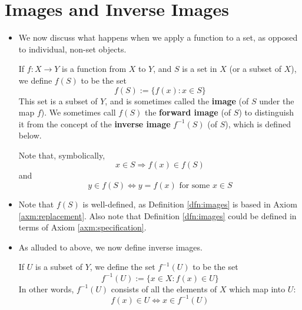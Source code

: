 \documentclass[../main.tex]{subfiles}
\begin{document}
\section{Images and Inverse Images}
\begin{itemize}
    \item {}We now discuss what happens when we apply a function to a set, as opposed to individual, non-set objects.
    \begin{dfn}\label{dfn:images}
        If $f:X\to Y$ is a function from $X$ to $Y$, and $S$ is a set in $X$ (or a subset of $X$), we define $f(S)$ to be the set
        \begin{equation*}
            f(S) := \{f(x):x\in S\}
        \end{equation*}
        This set is a subset of $Y$, and is sometimes called the \textbf{image} (of $S$ under the map $f$). We sometimes call $f(S)$ the \textbf{forward image} (of $S$) to distinguish it from the concept of the \textbf{inverse image} $f^{-1}(S)$ (of $S$), which is defined below.\par
        Note that, symbolically,
        \begin{equation*}
            x\in S \Longrightarrow f(x)\in f(S)
        \end{equation*}
        and
        \begin{equation*}
            y\in f(S) \Longleftrightarrow y=f(x)\text{ for some }x\in S
        \end{equation*}
    \end{dfn}
    \item Note that $f(S)$ is well-defined, as Definition \ref{dfn:images} is based in Axiom \ref{axm:replacement}. Also note that Definition \ref{dfn:images} could be defined in terms of Axiom \ref{axm:specification}.
    \item As alluded to above, we now define inverse images.
    \begin{dfn}\label{dfn:inverseImages}
        If $U$ is a subset of $Y$, we define the set $f^{-1}(U)$ to be the set
        \begin{equation*}
            f^{-1}(U) := \{x\in X:f(x)\in U\}
        \end{equation*}
        In other words, $f^{-1}(U)$ consists of all the elements of $X$ which map into $U$:
        \begin{equation*}
            f(x)\in U \Longleftrightarrow x\in f^{-1}(U)
        \end{equation*}

\end{dfn}
\end{itemize}
\end{document}

